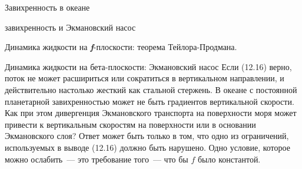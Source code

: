 \begin{chapter}{Завихренность в океане}
\begin{section}{завихренность и Экмановский насос}
\begin{paragraph}{Динамика жидкости на \textbf{\textit{f}}-плоскости: 
теорема Тейлора-Продмана.}
\end{paragraph}

\begin{paragraph}{Динамика жидкости на бета-плоскости: Экмановский насос}
Если (12.16) верно, поток не может расшириться или сократиться в
вертикальном направлении, и действительно настолько жесткий как
стальной стержень. В океане с постоянной планетарной завихренностью
может не быть градиентов вертикальной скорости. Как при этом
дивергенция Экмановского транспорта на поверхности моря может привести
к вертикальным скоростям на поверхности или в основании Экмановского
слоя? Ответ может быть только в том, что одно из ограничений,
используемых в выводе (12.16) должно быть нарушено. Одно условие,
которое можно ослабить~--- это требование того~--- что бы $f$ было
константой.
%


\end{paragraph}
\end{section}
\end{chapter}
